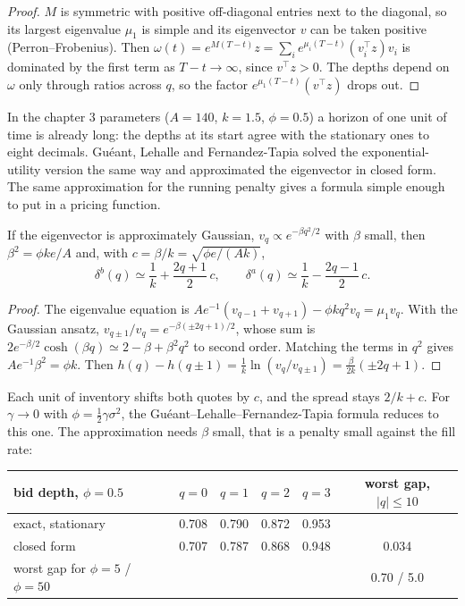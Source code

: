 \begin{proof}
$M$ is symmetric with positive off-diagonal entries next to the diagonal, so its largest eigenvalue $\mu_1$ is simple and its eigenvector $v$ can be
taken positive (Perron--Frobenius). Then $\omega(t)=e^{M(T-t)}z=\sum_ie^{\mu_i(T-t)}(v_i^\top z)v_i$ is dominated by the first term as $T-t\to\infty$,
since $v^\top z>0$. The depths depend on $\omega$ only through ratios across $q$, so the factor $e^{\mu_1(T-t)}(v^\top z)$ drops out.
\end{proof}

In the chapter 3 parameters ($A=140$, $k=1.5$, $\phi=0.5$) a horizon of one unit of time is already long: the depths at its start agree with the
stationary ones to eight decimals. Guéant, Lehalle and Fernandez-Tapia solved the exponential-utility version the same way and approximated the
eigenvector in closed form. The same approximation for the running penalty gives a formula simple enough to put in a pricing function.

\begin{proposition}\label{prop:hf:extensions-of-the-inventory-framework:closed}
If the eigenvector is approximately Gaussian, $v_q\propto e^{-\beta q^2/2}$ with $\beta$ small, then $\beta^2=\phi ke/A$ and, with
$c=\beta/k=\sqrt{\phi e/(Ak)}$,
\[
\delta^b(q)\simeq\frac1k+\frac{2q+1}{2}\,c,\qquad \delta^a(q)\simeq\frac1k-\frac{2q-1}{2}\,c .
\]
\end{proposition}

\begin{proof}
The eigenvalue equation is $Ae^{-1}(v_{q-1}+v_{q+1})-\phi kq^2v_q=\mu_1v_q$. With the Gaussian ansatz, $v_{q\pm1}/v_q=e^{-\beta(\pm2q+1)/2}$, whose sum
is $2e^{-\beta/2}\cosh(\beta q)\simeq2-\beta+\beta^2q^2$ to second order. Matching the terms in $q^2$ gives $Ae^{-1}\beta^2=\phi k$. Then
$h(q)-h(q\pm1)=\tfrac1k\ln(v_q/v_{q\pm1})=\tfrac{\beta}{2k}(\pm2q+1)$.
\end{proof}

Each unit of inventory shifts both quotes by $c$, and the spread stays $2/k+c$. For $\gamma\to0$ with $\phi=\tfrac12\gamma\sigma^2$, the
Guéant--Lehalle--Fernandez-Tapia formula reduces to this one. The approximation needs $\beta$ small, that is a penalty small against the fill rate:

\begin{center}
\small
\begin{tabular}{@{}lccccc@{}}
\toprule
bid depth, $\phi=0.5$ & $q=0$ & $q=1$ & $q=2$ & $q=3$ & worst gap, $|q|\le10$\\
\midrule
exact, stationary & 0.708 & 0.790 & 0.872 & 0.953 & \\
closed form & 0.707 & 0.787 & 0.868 & 0.948 & 0.034\\
\midrule
worst gap for $\phi=5$ / $\phi=50$ & & & & & 0.70 / 5.0\\
\bottomrule
\end{tabular}
\end{center}

